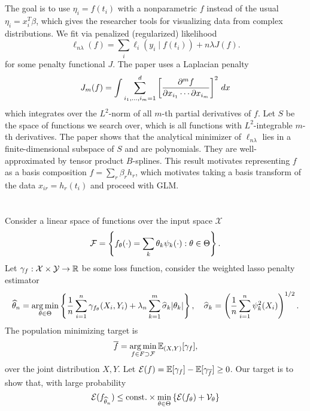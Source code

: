 \documentclass[12pt]{article}
\begin{document}
\section{\cite{o1986automatic}} 
The goal is to use $\eta_i = f(t_i)$ with a nonparametric $f$ instead of the
usual $\eta_i = x_i^T\beta$, which gives the researcher tools for visualizing
data from complex distributions. We fit via penalized (regularized) likelihood
\[
\ell_{n\lambda}(f) = \sum_i \ell_i(y_i \mid f(t_i)) + n\lambda J(f). 
\]
for some penalty functional $J$. The paper uses a Laplacian penalty \[ J_m(f) =
\int \sum_{i_1, \ldots, i_m = 1}^d \left[{\frac{\partial{^m f}}{\partial{x_{i_1} \cdots \partial
x_{i_m}}}}\right]^2 \,dx
\]
which integrates over the $L^2$-norm of all $m$-th partial derivatives of $f$.
Let $S$ be the space of functions we search over, which is all functions with
$L^2$-integrable $m$-th derivatives. The paper shows that the analytical
minimizer of $\ell_{n\lambda}$ lies in a finite-dimensional subspace of $S$ and
are polynomials. They are well-approximated by tensor product $B$-splines. This
result motivates representing $f$ as a basis composition $f = \sum_r \beta_r
h_r$, which motivates taking a basis transform of the data $x_{ir} = h_r(t_i)$
and proceed with GLM.

\section{\cite{van2008high}}

Consider a linear space of functions over the input space $\mathcal X$ \[
\mathcal F  = \left\{{f_\theta(\cdot) = \sum_k \theta_k \psi_k(\cdot): \theta \in \Theta}\right\}.
\]
Let $\gamma_f : \mathcal X \times \mathcal Y \to \mathbb{R}$ be some loss function, consider the weighted lasso penalty estimator \[
\widehat \theta_n = \operatorname*{arg\,min}_{\theta\in \Theta} \left\{{
    \frac{1}{n} \sum_{i=1}^n \gamma_{f_\theta}(X_i, Y_i) + \lambda_n \sum_{k=1}^m \widehat \sigma_k |\theta_k|
}\right\},\quad \widehat \sigma_k = \left({\frac{1}{n} \sum_{i=1}^n \psi_k^2 (X_i)}\right)^{1/2}.
\]
The population minimizing target is \[
\overline f = \operatorname*{arg\,min}_{f\in \mathcal \mathbf{F} \supset \mathcal F} \mathbb{E}_{(X,Y)}[\gamma_f],
\]
over the joint distribution $X,Y$. Let $\mathcal E(f) = \mathbb{E}[\gamma_f] - \mathbb{E}[\gamma_{\overline f}] \ge 0$. Our target is to show that, with large probability \[
\mathcal E(f_{\widehat \theta_n}) \le \text{const.} \times \min_{\theta\in\Theta} \left\{{
    \mathcal E(f_\theta) + \mathcal V_\theta
}\right\}
\]


\end{document}
